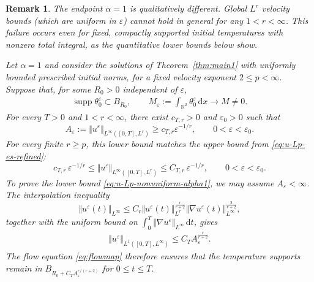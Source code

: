 \documentclass[reqno,11pt,a4paper]{amsart}
\newtheorem{remark}[theorem]{Remark}
\newcommand{\dd}{\mathrm{d}}
\begin{document}
\begin{remark}
\label{rmk:nonuniform-Lp-alpha1}
The endpoint $\alpha=1$ is qualitatively different.
Global $L^r$ velocity bounds (which are uniform in $\varepsilon$)  cannot hold
in general for any $1<r<\infty$.
This failure occurs even for fixed, compactly supported
initial temperatures with nonzero total integral,
as the quantitative lower bounds below show.


Let $\alpha=1$ and consider the solutions of
Theorem~\ref{thm:main1} with uniformly bounded prescribed
initial norms, for a fixed velocity exponent
$2\leq p<\infty$.
Suppose that, for some $R_0>0$ independent of $\varepsilon$,
\begin{align}\label{eq:velocity-bdd-assum}
 \operatorname{supp}\theta_0^\varepsilon\subset B_{R_0},
 \qquad
 M_\varepsilon:=\int_{\mathbb R^2}\theta_0^\varepsilon\,\dd x
 \longrightarrow M\ne0.
\end{align}
For every $T>0$ and $1<r<\infty$,
there exist
$c_{T,r}>0$ and $\varepsilon_0>0$ such that
\begin{equation}\label{eq:u-Lp-nonuniform-alpha1}
 A_\varepsilon:=\Vert u^\varepsilon\Vert _{L^\infty([0,T],L^r)}
 \geq c_{T,r}\varepsilon^{-1/r},
 \qquad 0<\varepsilon<\varepsilon_0.
\end{equation}
For every finite $r\geq p$, this lower bound matches
the upper bound from \eqref{eq:u-Lp-es-refined}:
\begin{equation}\label{eq:u-Lr-sharp-alpha1}
  c_{T,r}\,\varepsilon^{-1/r}
  \leq
  \Vert u^\varepsilon\Vert _{L^\infty([0,T],L^r)}
  \leq
  C_{T,r}\,\varepsilon^{-1/r},
  \qquad 0<\varepsilon<\varepsilon_0.
\end{equation}
To prove the lower bound \eqref{eq:u-Lp-nonuniform-alpha1}, we may assume
$A_\varepsilon<\infty$.
The interpolation inequality
\[
  \Vert u^\varepsilon(t)\Vert _{L^\infty}
  \leq C_r
  \Vert u^\varepsilon(t)\Vert _{L^r}^{\frac r{r+2}}
  \Vert \nabla u^\varepsilon(t)\Vert _{L^\infty}^{\frac2{r+2}},
\]
together with the uniform bound on
$\int_0^T\Vert \nabla u^\varepsilon\Vert _{L^\infty}\,\dd t$,
gives
\begin{align}\label{eq:u-eps-L1Linf}
  \Vert u^\varepsilon\Vert _{L^1([0,T],L^\infty)}
  \leq C_TA_\varepsilon^{\frac r{r+2}}.
\end{align}
The flow equation \eqref{eq:flowmap} therefore ensures
that the temperature supports remain in
$B_{R_0+C_TA_\varepsilon^{r/(r+2)}}$
for $0\leq t\leq T$.


\end{remark}
\end{document}
